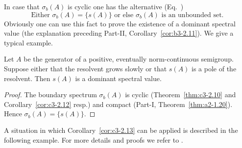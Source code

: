 In case that $\sigma_{b}(A)$ is cyclic one has the alternative (\cf Eq.~)
\[
\text{Either $\sigma_{b}(A) = \{s(A)\}$ or else $\sigma_{b}(A)$ is an unbounded set.}
\]
Obviously one can use this fact to prove the existence of a dominant spectral value (\cf the explanation preceding Part-II, Corollary~\ref{cor:b3-2.11}).
We give a typical example.
\begin{corollary}\label{cor:c3-2.13}
	Let $A$ be the generator of a positive, eventually norm-continuous semigroup.
	Suppose either that the resolvent grows slowly or that $s(A)$ is a pole of the resolvent.
	Then $s(A)$ is a dominant spectral value.%
\end{corollary}
\begin{proof}
The boundary spectrum $\sigma_{b}(A)$ is cyclic (Theorem~\ref{thm:c3-2.10} and Corollary~\ref{cor:c3-2.12} resp.) and compact (Part-I, Theorem~\ref{thm:a2-1.20}).
Hence $\sigma_{b}(A) = \{s(A)\}$.
\end{proof}
A situation in which Corollary~\ref{cor:c3-2.13} can be applied is described in the following example.
For more details and proofs we refer to \textcite{amann:1983}.
